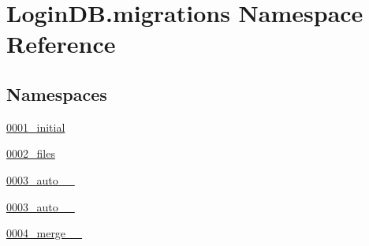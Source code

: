 \hypertarget{namespace_login_d_b_1_1migrations}{}\section{Login\+D\+B.\+migrations Namespace Reference}
\label{namespace_login_d_b_1_1migrations}
\subsection*{Namespaces}
\begin{DoxyCompactItemize}
\item 
 \hyperlink{namespace_login_d_b_1_1migrations_1_10001__initial}{0001\+\_\+initial}
\item 
 \hyperlink{namespace_login_d_b_1_1migrations_1_10002__files}{0002\+\_\+files}
\item 
 \hyperlink{namespace_login_d_b_1_1migrations_1_10003__auto__20201206__1720}{0003\+\_\+auto\+\_\+\_}
\item 
 \hyperlink{namespace_login_d_b_1_1migrations_1_10003__auto__20201206__1730}{0003\+\_\+auto\+\_\+\_}
\item 
 \hyperlink{namespace_login_d_b_1_1migrations_1_10004__merge__20201206__1751}{0004\+\_\+merge\+\_\+\_}
\end{DoxyCompactItemize}
